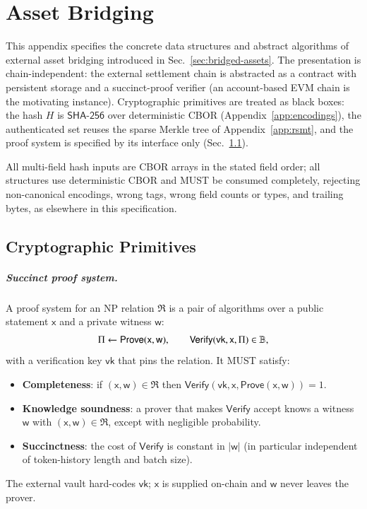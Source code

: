 \chapter{Asset Bridging}\label{app:bridging}

This appendix specifies the concrete data structures and abstract algorithms of external asset bridging introduced in Sec.~\ref{sec:bridged-assets}. The presentation is chain-independent: the external settlement chain is abstracted as a contract with persistent storage and a succinct-proof verifier (an account-based EVM chain is the motivating instance). Cryptographic primitives are treated as black boxes: the hash $H$ is $\mathsf{SHA\text{-}256}$ over deterministic CBOR (Appendix~\ref{app:encodings}), the authenticated set reuses the sparse Merkle tree of Appendix~\ref{app:rsmt}, and the proof system is specified by its interface only (Sec.~\ref{app:bridging-primitives}).

All multi-field hash inputs are CBOR arrays in the stated field order; all structures use deterministic CBOR and MUST be consumed completely, rejecting non-canonical encodings, wrong tags, wrong field counts or types, and trailing bytes, as elsewhere in this specification.

\section{Cryptographic Primitives}\label{app:bridging-primitives}

\paragraph{Succinct proof system.}
A proof system for an NP relation $\mathfrak{R}$ is a pair of algorithms over a public statement $\mathsf{x}$ and a private witness $\mathsf{w}$:
\[
\Pi \gets \mathsf{Prove}(\mathsf{x},\mathsf{w}), \qquad
\mathsf{Verify}(\mathsf{vk},\mathsf{x},\Pi) \in \mathbb{B},
\]
with a verification key $\mathsf{vk}$ that pins the relation. It MUST satisfy:
\begin{itemize}
  \item \textbf{Completeness}: if $(\mathsf{x},\mathsf{w}) \in \mathfrak{R}$ then $\mathsf{Verify}(\mathsf{vk},\mathsf{x},\mathsf{Prove}(\mathsf{x},\mathsf{w}))=1$.
  \item \textbf{Knowledge soundness}: a prover that makes $\mathsf{Verify}$ accept knows a witness $\mathsf{w}$ with $(\mathsf{x},\mathsf{w}) \in \mathfrak{R}$, except with negligible probability.
  \item \textbf{Succinctness}: the cost of $\mathsf{Verify}$ is constant in $|\mathsf{w}|$ (in particular independent of token-history length and batch size).
\end{itemize}
The external vault hard-codes $\mathsf{vk}$; $\mathsf{x}$ is supplied on-chain and $\mathsf{w}$ never leaves the prover.

